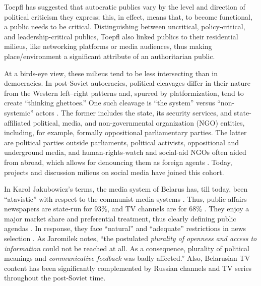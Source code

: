 Toepfl \cite{Toepfl} has suggested that autocratic publics vary by the level and direction of political criticism they express; this, in effect, means that, to become functional, a public needs to be critical. Distinguishing between uncritical, policy-critical, and leadership-critical publics, Toepfl also linked publics to their residential milieus, like networking platforms or media audiences, thus making place/environment a significant attribute of an authoritarian public.

At a birds-eye view, these milieus tend to be less intersecting than in democracies. In post-Soviet autocracies, political cleavages differ in their nature from the Western left–right patterns \cite{BodrunovaLitvinenko2015,Manaev} and, spurred by platformization, tend to create “thinking ghettoes.” One such cleavage is “the system” versus “non-systemic” actors \cite{Ledeneva}. The former includes the state, its security services, and state-affiliated political, media, and non-governmental organization (NGO) entities, including, for example, formally oppositional parliamentary parties. The latter are political parties outside parliaments, political activists, oppositional and underground media, and human-rights-watch and social-aid NGOs often aided from abroad, which allows for denouncing them as foreign agents \cite{EgorovShutovKatsuk}. Today, projects and discussion milieus on social media have joined this cohort.

In Karol Jakubowicz’s terms, the media system of Belarus has, till today, been “atavistic” with respect to the communist media systems \cite[p.~21]{Jakubowicz}. Thus, public affairs newspapers are state-run for 93\%, and TV channels are for 68\% \cite[p.~210]{Manaev}. They enjoy a major market share and preferential treatment, thus clearly defining public agendas \cite{Shirokanova}. In response, they face “natural” and “adequate” restrictions in news selection \cite{SchimpfosslYablokov}. As Jaromilek \cite[p.~89, emphasis in original]{Jaromilek} notes, “the postulated \textit{plurality of openness and access to information} could not be reached at all. As a consequence, plurality of political meanings and \textit{communicative feedback} was badly affected.” Also, Belarusian TV content has been significantly complemented by Russian channels and TV series throughout the post-Soviet time.

